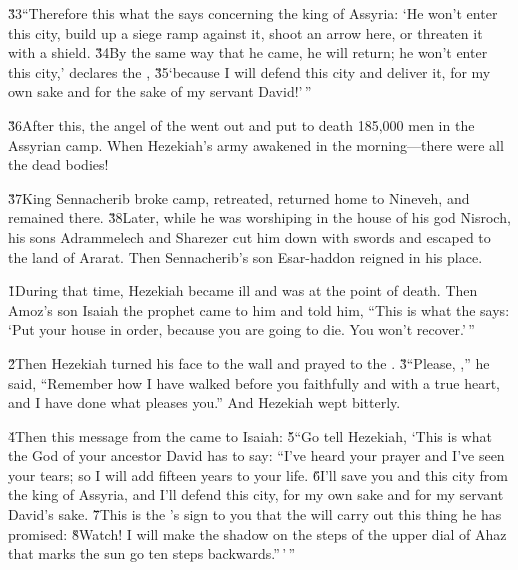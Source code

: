 \v{33}``Therefore this what the  says concerning the king of Assyria: `He won't enter this city, build up a siege ramp against it, shoot an arrow here, or threaten it with a shield. \v{34}By the same way that he came, he will return; he won't enter this city,' declares the , \v{35}`because I will defend this city and deliver it, for my own sake and for the sake of my servant David!'\,''

\v{36}After this, the angel of the  went out and put to death 185,000 men in the Assyrian camp. When Hezekiah's army awakened in the morning---there were all the dead bodies!

\v{37}King Sennacherib broke camp, retreated, returned home to Nineveh, and remained there. \v{38}Later, while he was worshiping in the house of his god Nisroch, his sons Adrammelech and Sharezer cut him down with swords and escaped to the land of Ararat. Then Sennacherib's son Esar-haddon reigned in his place.

\v{1}During that time, Hezekiah became ill and was at the point of death. Then Amoz's son Isaiah the prophet came to him and told him, ``This is what the  says: `Put your house in order, because you are going to die. You won't recover.'\,''

\v{2}Then Hezekiah turned his face to the wall and prayed to the . \v{3}``Please, ,'' he said, ``Remember how I have walked before you faithfully and with a true heart, and I have done what pleases you.'' And Hezekiah wept bitterly.

\v{4}Then this message from the  came to Isaiah: \v{5}``Go tell Hezekiah, `This is what the  God of your ancestor David has to say: ``I've heard your prayer and I've seen your tears; so I will add fifteen years to your life. \v{6}I'll save you and this city from the king of Assyria, and I'll defend this city, for my own sake and for my servant David's sake. \v{7}This is the 's sign to you that the  will carry out this thing he has promised: \v{8}Watch! I will make the shadow on the steps of the upper dial of Ahaz that marks the sun go ten steps backwards.''\,'\,''

